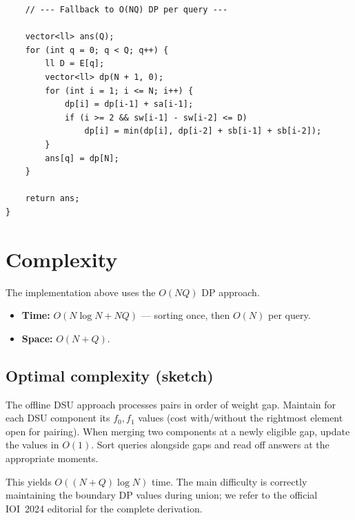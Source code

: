 \documentclass[11pt,a4paper]{article}
\begin{document}
\begin{lstlisting}
    // --- Fallback to O(NQ) DP per query ---

    vector<ll> ans(Q);
    for (int q = 0; q < Q; q++) {
        ll D = E[q];
        vector<ll> dp(N + 1, 0);
        for (int i = 1; i <= N; i++) {
            dp[i] = dp[i-1] + sa[i-1];
            if (i >= 2 && sw[i-1] - sw[i-2] <= D)
                dp[i] = min(dp[i], dp[i-2] + sb[i-1] + sb[i-2]);
        }
        ans[q] = dp[N];
    }

    return ans;
}
\end{lstlisting}

\section{Complexity}

The implementation above uses the $O(NQ)$ DP approach.
\begin{itemize}
  \item \textbf{Time:} $O(N \log N + NQ)$ --- sorting once, then $O(N)$
        per query.
  \item \textbf{Space:} $O(N + Q)$.
\end{itemize}

\subsection*{Optimal complexity (sketch)}

The offline DSU approach processes pairs in order of weight gap.
Maintain for each DSU component its $f_0, f_1$ values (cost with/without
the rightmost element open for pairing).  When merging two components
at a newly eligible gap, update the values in $O(1)$.  Sort queries
alongside gaps and read off answers at the appropriate moments.

This yields $O((N + Q) \log N)$ time.  The main difficulty is correctly
maintaining the boundary DP values during union; we refer to the
official IOI~2024 editorial for the complete derivation.
\end{document}
